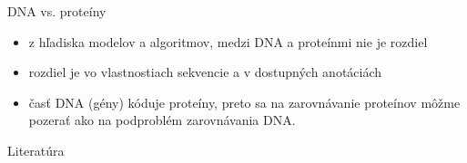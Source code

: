 \documentclass[xcolor=dvipsnames, compress, 12pt]{beamer}
\theoremstyle{definition}
\begin{document}
\begin{frame}{DNA vs. proteíny}
\begin{itemize}
  \item z hľadiska modelov a algoritmov, medzi DNA a proteínmi nie je rozdiel
  \item rozdiel je vo vlastnostiach sekvencie a v dostupných anotáciách
  \item časť DNA (gény) kóduje proteíny, preto sa na zarovnávanie proteínov môžme pozerať ako na podproblém zarovnávania DNA.
\end{itemize}


\end{frame}




\begin{frame}[allowframebreaks]{Literatúra}
  
  
\end{frame}
\end{document}
